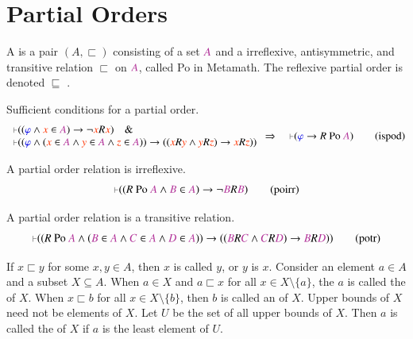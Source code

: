 \section{Partial Orders}\label{sec:partialorders}

\pn A  is a pair $(A, \sqsubset)$ consisting of a set $\mc{A}$ and a irreflexive, antisymmetric, and transitive relation $\sqsubset$ on $\mc{A}$, called Po in Metamath. 
The reflexive partial order is denoted $\sqsubseteq$ .  

\begin{lemma} {Sufficient conditions for a partial order.} 
\begin{align}
  \begin{array}{l}
    \mm{\vdash} ( ( \mw{\varphi} \wedge \msc{x} \in \mc{A} ) \rightarrow \lnot
    \msc{x} R \msc{x} )\quad\&\quad \notag
   \\ \mm{\vdash} ( ( \mw{\varphi} \wedge (
    \msc{x} \in \mc{A} \wedge \msc{y} \in \mc{A} \wedge \msc{z} \in \mc{A} ) )
    \rightarrow ( ( \msc{x} R \msc{y} \wedge \msc{y} R \msc{z} ) \rightarrow
    \msc{x} R \msc{z} ) ) \notag
    \end{array}
    \Rightarrow\quad \mm{\vdash} ( \mw{\varphi}
    \rightarrow R~ {\rm Po} ~\mc{A} )\label{eq:ispod}\tag{ispod}
\end{align}
\end{lemma}
\begin{lemma} {A partial order relation is irreflexive.} 
\begin{align}
\mm{\vdash} ( ( R~ {\rm Po}~ \mc{A} \wedge \mc{B} \in \mc{A} ) \rightarrow \lnot
    \mc{B} R \mc{B} )\label{eq:poirr}\tag{poirr}
\end{align}
\end{lemma}
\begin{lemma} {A partial order relation is a transitive relation.} 
\begin{align}
\mm{\vdash} ( ( R~{\rm Po}~\mc{A} \wedge ( \mc{B} \in \mc{A} \wedge \mc{C} \in
    \mc{A} \wedge \mc{D} \in \mc{A} ) ) \rightarrow ( ( \mc{B} R \mc{C} \wedge
    \mc{C} R \mc{D} ) \rightarrow \mc{B} R \mc{D} ) )\label{eq:potr}\tag{potr}
\end{align}
\end{lemma}


If $x\sqsubset y$ for some $x,y\in A$, then $x$ is called  $y$, or $y$ is  $x$.  
Consider an element $a\in A$ and a subset $X\subseteq A$.  When $a\in X$ and $a \sqsubset x$ for all $x\in X\setminus\{a\}$, the $a$ is called the  of $X$.  
When $x \sqsubset b$ for all $x\in X\setminus\{b\}$, then $b$ is called an  of 
$X$.  Upper bounds of $X$ need not be elements of $X$.
Let $U$ be the set of all upper bounds of $X$.  Then $a$ is called the  of $X$ if 
$a$ is the least element of $U$.

